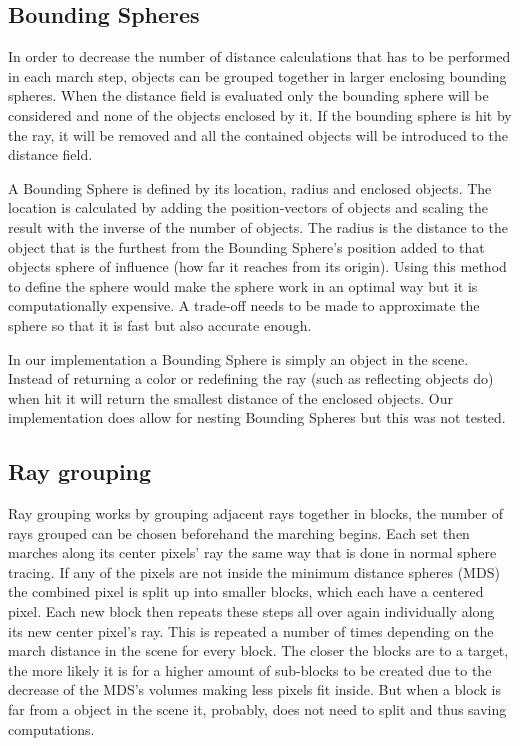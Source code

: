 		\subsection{Bounding Spheres}
			
			In order to decrease the number of distance calculations that has 
			to be performed in each march step, objects can be grouped together 
			in larger enclosing bounding spheres. When the distance field is 
			evaluated only the bounding sphere will be considered and none of 
			the objects enclosed by	it. If the bounding sphere is hit by the 
			ray, it will be removed and all	the contained objects will be 
			introduced to the distance field.
			
			A Bounding Sphere is defined by its location, radius and enclosed
			objects. The location is calculated by adding the position-vectors
			of objects and scaling the result with the inverse of the number of
			objects. The radius is the distance to the object that is the
			furthest from the Bounding Sphere's position added to that objects
			sphere of influence (how far it reaches from its origin). Using 
			this method to define the sphere would make the sphere work in an 
			optimal way but it is computationally expensive. A trade-off needs 
			to be made to approximate the sphere so that it is fast but also 
			accurate enough.

			In our implementation a Bounding Sphere is simply an object in the
			scene. Instead of returning a color or redefining the ray (such 
			as reflecting objects do) when hit it will return the smallest 
			distance of the enclosed objects. Our implementation does allow for
			nesting Bounding Spheres but this was not tested.
			
		\subsection{Ray grouping}
		
			
		
			Ray grouping works by grouping adjacent rays together in blocks, the number of 
			rays grouped can be chosen beforehand the marching begins. Each set 
			then marches along its center pixels' ray the same way that is done 
			in normal sphere tracing. If any of the pixels are not inside the 
			minimum distance spheres (MDS) the combined pixel is split up into 
			smaller blocks, which each have a centered pixel. Each new block 
			then repeats these steps all over again individually along its new 
			center pixel's ray. This is repeated a number of times depending on 
			the march distance in the scene for every block. The closer the blocks 
			are to a target, the more likely it is for a higher amount of sub-blocks 
			to be created due to the decrease of the MDS's volumes making less pixels 
			fit inside. But when a block is far from a object in the scene it, probably, 
			does not need to split and thus saving computations.
			
